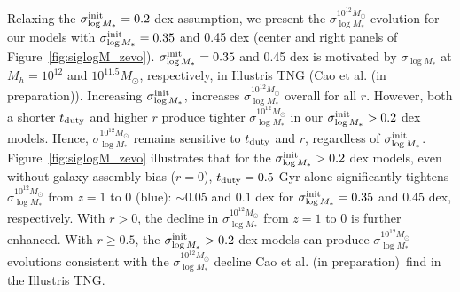 \documentclass[12pt, letterpaper, preprint, tighten]{aastex62}
\newcommand{\edt}[1]{{\color{dred}{\bf} #1}}
\newcommand{\cao}{Cao et al. (in preparation)}
\newcommand{\siglogm}{\sigma_{\log M_*}}
\begin{document}
\edt{Relaxing the $\siglogm^{\rm init} = 0.2$ dex assumption, we present the 
$\siglogm^{10^{12}M_\odot}$ evolution for our models with $\siglogm^{\rm init} = 0.35$
and 0.45 dex (center and right panels of Figure~\ref{fig:siglogM_zevo}).  
$\siglogm^{\rm init} = 0.35$ and 0.45 dex is motivated by $\siglogm$ at 
$M_h = 10^{12}$ and $10^{11.5}M_\odot$, respectively, in Illustris TNG (\cao). 
Increasing $\siglogm^{\rm init}$, increases $\siglogm^{10^{12}M_\odot}$ overall 
for all $r$. However, both a shorter $t_{\rm duty}$ and higher $r$ produce 
tighter $\siglogm^{10^{12}M_\odot}$ in our $\siglogm^{\rm init} > 0.2$ dex 
models. Hence, $\siglogm^{10^{12}M_\odot}$ remains sensitive to 
$t_{\rm duty}$ and $r$, regardless of $\siglogm^{\rm init}$. 
Figure~\ref{fig:siglogM_zevo} illustrates that for the $\siglogm^{\rm init}> 0.2$ dex 
models, even without galaxy assembly bias ($r=0$), $t_{\rm duty} = 0.5$ Gyr 
alone significantly tightens $\siglogm^{10^{12}M_\odot}$ from $z=1$ to 0 
(blue): $\sim0.05$ and $0.1$ dex for $\siglogm^{\rm init} = 0.35$ and 
$0.45$ dex, respectively. With $r > 0$, the decline in $\siglogm^{10^{12}M_\odot}$  
from $z=1$ to 0 is further enhanced. With $r \ge 0.5$, the $\siglogm^{\rm init}> 0.2$ dex 
models can produce $\siglogm^{10^{12}M_\odot}$ evolutions consistent with 
the $\siglogm^{10^{12}M_\odot}$ decline \cao~find in the Illustris TNG. 
}
\end{document}
